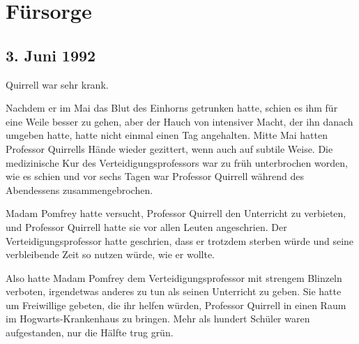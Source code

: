 \chapter{Fürsorge}

\section{3. Juni 1992}

 Quirrell war sehr krank.

\hplettrineextrapara
Nachdem er im Mai das Blut des Einhorns getrunken hatte, schien es ihm für eine Weile besser zu gehen, aber der Hauch von intensiver Macht, der ihn danach umgeben hatte, hatte nicht einmal einen Tag angehalten. Mitte Mai hatten Professor Quirrells Hände wieder gezittert, wenn auch auf subtile Weise. Die medizinische Kur des Verteidigungsprofessors war zu früh unterbrochen worden, wie es schien und vor sechs Tagen war Professor Quirrell während des Abendessens zusammengebrochen.

Madam Pomfrey hatte versucht, Professor Quirrell den Unterricht zu verbieten, und Professor Quirrell hatte sie vor allen Leuten angeschrien. Der Verteidigungsprofessor hatte geschrien, dass er trotzdem sterben würde und seine verbleibende Zeit so nutzen würde, wie er wollte.

Also hatte Madam Pomfrey dem Verteidigungsprofessor mit strengem Blinzeln verboten, irgendetwas anderes zu tun als seinen Unterricht zu geben. Sie hatte um Freiwillige gebeten, die ihr helfen würden, Professor Quirrell in einen Raum im Hogwarts-Krankenhaus zu bringen. Mehr als hundert Schüler waren aufgestanden, nur die Hälfte trug grün.

